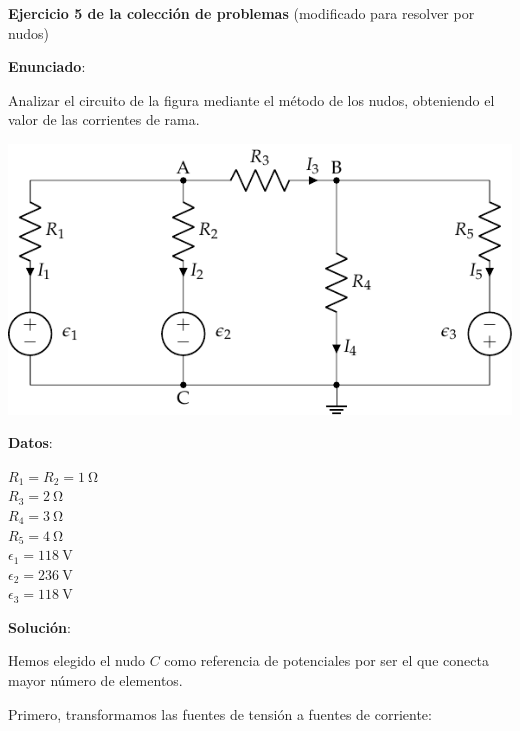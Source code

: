 \documentclass[10pt]{article}
\begin{document}
\large{\textbf{Ejercicio 5 de la colección de problemas}} (modificado para resolver por nudos)

\vspace{3mm}
\large{\textbf{Enunciado}}:

\vspace{3mm}
Analizar el circuito de la figura mediante el método de los nudos, obteniendo el valor de las corrientes de rama.

\begin{minipage}{0.75\linewidth}
  \includegraphics[scale=1.2]{figs/ejercicio5_coleccion_nudos1.pdf}
\end{minipage}
\begin{minipage}{0.25\linewidth}
    \textbf{Datos}:
    \vspace{2mm}
    
    $R_1 = R_2 = \qty{1}{\ohm}$\\ 
    $R_3 = \qty{2}{\ohm}$\\
    $R_4 = \qty{3}{\ohm}$\\
    $R_5=\qty{4}{\ohm}$\\
    $\epsilon_1=\qty{118}{\volt}$\\
    $\epsilon_2 = \qty{236}{\volt}$\\
    $\epsilon_3 = \qty{118}{\volt}$    
\end{minipage}

\vspace{4mm}

\hrulefill

\vspace{5mm}
\textbf{Solución}:
\vspace{4mm}

Hemos elegido el nudo $C$ como referencia de potenciales por ser el que conecta mayor número de elementos.

\vspace{2mm}
Primero, transformamos las fuentes de tensión a fuentes de corriente:
\end{document}

